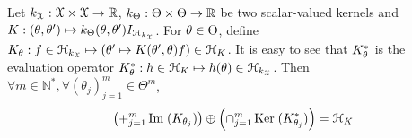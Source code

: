 \begin{lemma} \label{lemma:decompo_ortho}
    Let $k_{\mathcal{X}}:\mathcal{X} \times \mathcal{X} \rightarrow \mathbb{R}$,
    $k_{\Theta}:\Theta \times \Theta
    \rightarrow \mathbb{R}$  be two scalar-valued kernels and $K : (\theta,\theta')
    \mapsto k_{\Theta}(\theta,\theta')I_{\mathcal{H}_{k_{\mathcal{X}}}}$.  For
    $\theta \in \Theta$, define $K_{\theta}: f
    \in \mathcal{H}_{k_{\mathcal{X}}} \mapsto \left ( \theta' \mapsto
    K(\theta',\theta)f \right ) \in \mathcal{H}_K$.  It is easy to
    see that $K_{\theta}^*$ is the evaluation operator
    $K_{\theta}^*: h \in \mathcal{H}_K \mapsto h(\theta) \in
    \mathcal{H}_{k_{\mathcal{X}}}$.  Then $\forall m \in \mathbb{N}^*, \forall
    (\theta_j)_{j=1}^m \in \Theta^m$,
    \begin{dmath} \label{equation:decompo_ortho}
        \left ( +_{j=1}^m \Image(K_{\theta_j}) \right) \oplus \left
        (\cap_{j=1}^m \Nullspace(K_{\theta_j} ^*) \right ) = \mcH_K
    \end{dmath}
\end{lemma}
